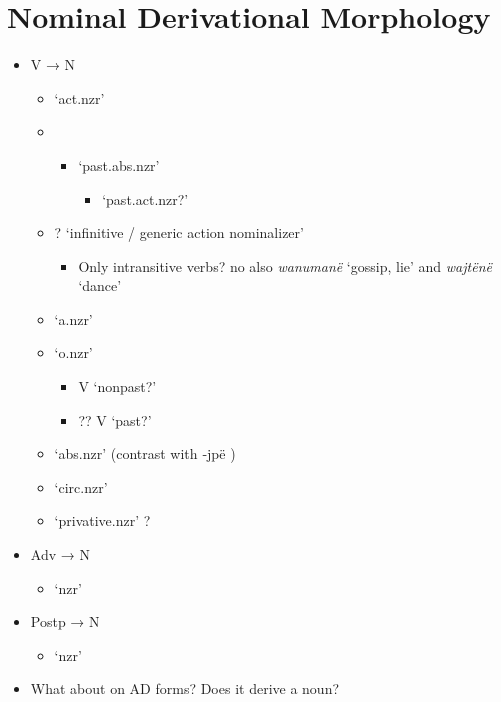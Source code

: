 \documentclass{memoir}
\begin{document}
\section{\texorpdfstring{Nominal Derivational Morphology
\label{sec:nounderiv}}{Nominal Derivational Morphology }}

\begin{itemize}
\tightlist
\item
  V → N

  \begin{itemize}
  \item
     `act.nzr'
  \item

    \begin{itemize}
    \tightlist
    \item
      `past.abs.nzr'

      \begin{itemize}
      \tightlist
      \item
        `past.act.nzr?'
      \end{itemize}
    \end{itemize}
  \item
    ? `infinitive / generic action nominalizer'

    \begin{itemize}
    \tightlist
    \item
      Only intransitive verbs? no also \emph{wanumanë} `gossip, lie' and
      \emph{wajtënë} `dance'
    \end{itemize}
  \item
     `a.nzr'
  \item
     `o.nzr'

    \begin{itemize}
    \tightlist
    \item
      V `nonpast?'
    \item
      ?? V `past?'
    \end{itemize}
  \item
     `abs.nzr' (contrast with ‑jpë )
  \item
     `circ.nzr'
  \item
     `privative.nzr' ?
  \end{itemize}
\item
  Adv → N

  \begin{itemize}
  \tightlist
  \item
     `nzr'
  \end{itemize}
\item
  Postp → N

  \begin{itemize}
  \tightlist
  \item
     `nzr'
  \end{itemize}
\item
  What about  on AD forms? Does it derive a noun?
\end{itemize}
\end{document}
